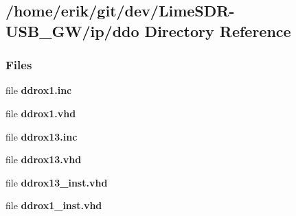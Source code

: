 \subsection{/home/erik/git/dev/\+Lime\+S\+D\+R-\/\+U\+S\+B\+\_\+\+G\+W/ip/ddo Directory Reference}
\label{dir_b5124c4f45085a4bd5a77eb8215bad80}
\subsubsection*{Files}
\begin{DoxyCompactItemize}
\item 
file {\bf ddrox1.\+inc}
\item 
file {\bf ddrox1.\+vhd}
\item 
file {\bf ddrox13.\+inc}
\item 
file {\bf ddrox13.\+vhd}
\item 
file {\bf ddrox13\+\_\+inst.\+vhd}
\item 
file {\bf ddrox1\+\_\+inst.\+vhd}
\end{DoxyCompactItemize}
